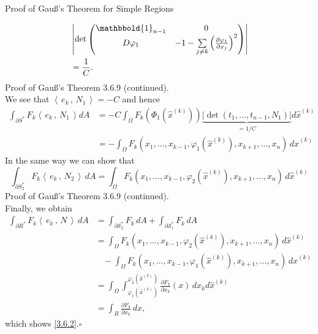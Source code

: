 \documentclass[smaller,hyperref={CJKbookmarks=true}]{beamer}
\newcommand{\scp}[2]{\left\langle\,#1\,,\,#2\,\right\rangle} \newcommand{\scpp}{\langle\,\cdot\,,\,\cdot\,\rangle}
\begin{document}
\begin{frame}{Proof of Gau\ss's Theorem for Simple Regions}
\begin{spacing}{1.1}
\begin{equation*}
\begin{split}
       &\left|\det\begin{pmatrix}
                    \mathbbold{1}_{n-1} & 0 \\
                    D\varphi_1 & -1-\sum\limits_{j\neq k}\left(\frac{\partial\varphi_1}{\partial x_j}\right)^2
                  \end{pmatrix}\right| \\
       &=\frac{1}{C}.
  \end{split}
\end{equation*}
\newpage
\vspace*{14pt}
\alert{Proof of Gau\ss's Theorem 3.6.9 (continued).}\\
We see that $\scp{e_k}{N_1}=-C$ and hence
\begin{equation*}
  \begin{split}
     \int_{\partial S^*}F_k\scp{e_k}{N_1}dA &=-C\int_\Omega F_k(\Phi_1(\hat{x}^{(k)}))
     \underbrace{|\det(t_1,\ldots,t_{n-1},N_1)|}_{=1/C}d\hat{x}^{(k)} \\
       &=-\int_\Omega F_k(x_1,\ldots,x_{k-1},\varphi_1(\hat{x}^{(k)}),x_{k+1},\ldots,x_n)
       \,d\hat{x}^{(k)}
  \end{split}
\end{equation*}
In the same way we can show that
\[\int_{\partial S_2^*}F_k\scp{e_k}{N_2}\,dA=\int_\Omega F_k(x_1,\ldots,x_{k-1},\varphi_2(\hat{x}^{(k)}),x_{k+1},
\ldots,x_n)\,d\hat{x}^{(k)}\]
\newpage
\alert{Proof of Gau\ss's Theorem 3.6.9 (continued).}\\
Finally, we obtain
\begin{equation*}
  \begin{split}
     \int_{\partial R^*}F_k\scp{e_k}{N}\,dA &=\int_{\partial\mathcal{S}_2^*}F_k\,dA
     +\int_{\partial\mathcal{S}_1^*}F_k\,dA \\
       &=\int_\Omega F_k(x_1,\ldots,x_{k-1},\varphi_2(\hat{x}^{(k)}),
       x_{k+1},\ldots,x_n)\,d\hat{x}^{(k)} \\
       &~~~~-\int_\Omega F_k(x_1,\ldots,x_{k-1},\varphi_1(\hat{x}^{(k)}),
       x_{k+1},\ldots,x_n)\,d\hat{x}^{(k)} \\
       &=\int_\Omega\int_{\varphi_1(\hat{x}^{(k)})}^{\varphi_2(\hat{x}^{(k)})}
       \frac{\partial F_k}{\partial x_k}(x)\,dx_kd\hat{x}^{(k)} \\
       &=\int_R\frac{\partial F_k}{\partial x_k}\,dx,
  \end{split}
\end{equation*}
which shows \eqref{3.6.2}.$\square$
\end{spacing}
\end{frame}
\end{document}
